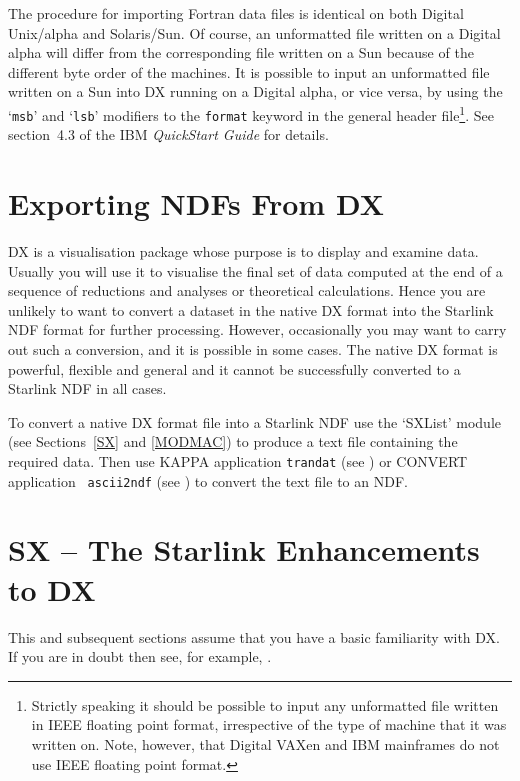 The procedure for importing Fortran data files is identical on both
Digital Unix/alpha and Solaris/Sun.  Of course, an unformatted file
written on a Digital alpha will differ from the corresponding file
written on a Sun because of the different byte order of the machines.
It is possible to input an unformatted file written on a Sun into DX
running on a Digital alpha, or vice versa, by using the `{\tt msb}' and
`{\tt lsb}' modifiers to the {\tt format} keyword in the general header
file\footnote{Strictly speaking it should be possible to input any
unformatted file written in IEEE floating point format, irrespective of
the type of machine that it was written on. Note, however, that Digital
VAXen and IBM mainframes do not use IEEE floating point format.}. See
section~4.3 of the IBM {\it QuickStart Guide}\cite{QUICKS} for details.


\section{Exporting NDFs From DX  }

DX is a visualisation package whose purpose is to display and examine
data. Usually you will use it to visualise the final set of data computed
at the end of a sequence of reductions and analyses or theoretical
calculations. Hence you are unlikely to want to convert a dataset in the
native DX format into the Starlink NDF format for further processing.
However, occasionally you may want to carry out such a conversion, and
it is possible in some cases. The native DX format is powerful, flexible
and general and it cannot be successfully converted to a Starlink NDF in
all cases.

To convert a native DX format file into a Starlink NDF use the `SXList'
module (see Sections~\ref{SX} and \ref{MODMAC}) to produce a text file
containing the required data. Then use KAPPA application {\tt trandat}
(see \cite{SUN95}) or CONVERT application {\tt
ascii2ndf} (see \cite{SUN55}) to convert the text
file to an NDF.


\section{SX -- The Starlink Enhancements to DX \label{SX}  }

This and subsequent sections assume that you have a basic familiarity
with DX. If you are in doubt then see, for example,
\cite{SC2}.

